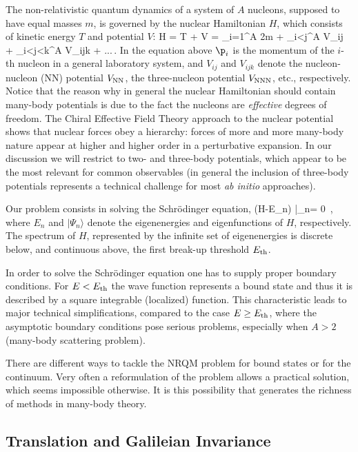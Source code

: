 The non-relativistic quantum dynamics of a system of $A$ nucleons, supposed to have equal masses $m$,
is governed by the nuclear Hamiltonian $H$, 
which consists of kinetic energy $T$ and potential $V$:
\be
H = T + V  = \sum_{i=1}^A { {2m} } + \sum_{i<j}^A V_{ij} + \sum_{i<j<k}^A V_{ijk} + ...\,.
\label{Hint}
\ee
In the equation above ${\p}_i$ is the momentum of the $i$-th nucleon in a general laboratory system,  
and $V_{ij}$ and $V_{ijk}$ denote the nucleon-nucleon (NN)
potential $V_{\rm NN}$, the three-nucleon potential $V_{\rm NNN}$, etc., respectively.
Notice that the reason why in general the nuclear Hamiltonian should contain many-body potentials is due to the fact 
the nucleons are {\it effective} degrees of freedom. The Chiral Effective Field Theory approach to the nuclear potential~\cite{EpM11}
 shows that nuclear forces obey a hierarchy: forces of
more and more many-body nature appear at higher and higher order in a perturbative expansion. 
In our discussion we will restrict to two- and three-body potentials, which appear to be the most relevant for common observables (in
general the inclusion of three-body potentials represents a technical challenge for most {\it ab initio} approaches).

Our problem consists in solving the Schr\"odinger equation,
\be
(H-E_n) |\Psi_n\rangle = 0 \,,
\ee
where $E_n$ and $|\Psi_n\rangle$ denote the eigenenergies and eigenfunctions of $H$, respectively.
The spectrum of $H$, represented by the infinite set of eigenenergies is discrete below, and continuous above, 
the first break-up threshold $E_{\rm th}$. 


In order to solve the Schr\"odinger equation  one has to supply proper
boundary conditions.  For $E < E_{\rm th}$ the wave function represents a bound state
and thus it is described by a square integrable (localized) function. This characteristic 
leads to major technical simplifications, compared
to the case  $E \ge E_{\rm th}$, where  the asymptotic boundary conditions pose   serious problems, especially when  $A>2$ 
(many-body scattering problem). 

There are different ways to tackle the NRQM problem for bound states or for the continuum. 
Very often a reformulation of the problem allows a practical solution, 
which seems impossible otherwise. It is this possibility that generates the richness of methods in many-body theory.



\subsection{Translation and Galileian Invariance}\label{sec:TGI}


